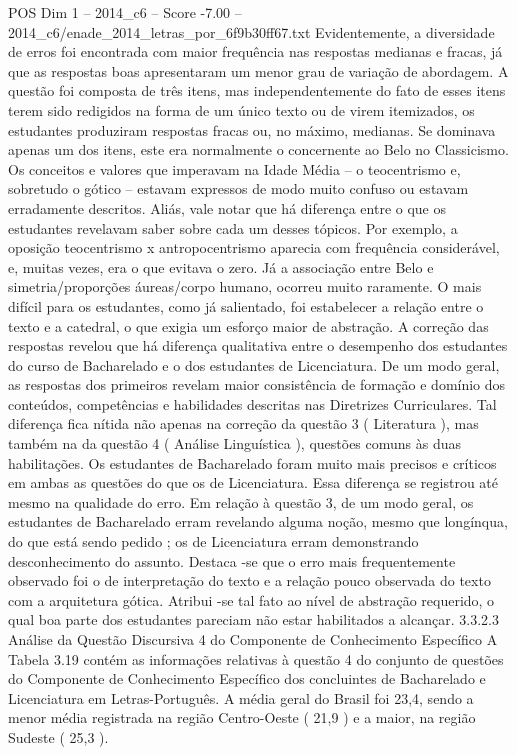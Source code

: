 \begin{textsample}{POS Dim 1 – 2014\_c6 – Score -7.00 – 2014\_c6/enade\_2014\_letras\_por\_6f9b30ff67.txt}
Evidentemente, a diversidade de erros foi encontrada com maior frequência nas respostas medianas e fracas, já que as respostas boas apresentaram um menor grau de variação de abordagem.
A questão foi composta de três itens, mas independentemente do fato de esses itens terem sido redigidos na forma de um único texto ou de virem itemizados, os estudantes produziram respostas fracas ou, no máximo, medianas.
Se dominava apenas um dos itens, este era normalmente o concernente ao Belo no Classicismo.
Os conceitos e valores que imperavam na Idade Média – o teocentrismo e, sobretudo o gótico – estavam expressos de modo muito confuso ou estavam erradamente descritos.
Aliás, vale notar que há diferença entre o que os estudantes revelavam saber sobre cada um desses tópicos.
Por exemplo, a oposição teocentrismo x antropocentrismo aparecia com frequência considerável, e, muitas vezes, era o que evitava o zero.
Já a associação entre Belo e simetria/proporções áureas/corpo humano, ocorreu muito raramente.
O mais difícil para os estudantes, como já salientado, foi estabelecer a relação entre o texto e a catedral, o que exigia um esforço maior de abstração.
A correção das respostas revelou que há diferença qualitativa entre o desempenho dos estudantes do curso de Bacharelado e o dos estudantes de Licenciatura.
De um modo geral, as respostas dos primeiros revelam maior consistência de formação e domínio dos conteúdos, competências e habilidades descritas nas Diretrizes Curriculares.
Tal diferença fica nítida não apenas na correção da questão 3 ( Literatura ), mas também na da questão 4 ( Análise Linguística ), questões comuns às duas habilitações.
Os estudantes de Bacharelado foram muito mais precisos e críticos em ambas as questões do que os de Licenciatura.
Essa diferença se registrou até mesmo na qualidade do erro.
Em relação à questão 3, de um modo geral, os estudantes de Bacharelado erram revelando alguma noção, mesmo que longínqua, do que está sendo pedido ; os de Licenciatura erram demonstrando desconhecimento do assunto.
Destaca -se que o erro mais frequentemente observado foi o de interpretação do texto e a relação pouco observada do texto com a arquitetura gótica.
Atribui -se tal fato ao nível de abstração requerido, o qual boa parte dos estudantes pareciam não estar habilitados a alcançar. 3.3.2.3 Análise da Questão Discursiva 4 do Componente de Conhecimento Específico A Tabela 3.19 contém as informações relativas à questão 4 do conjunto de questões do Componente de Conhecimento Específico dos concluintes de Bacharelado e Licenciatura em Letras-Português.
A média geral do Brasil foi 23,4, sendo a menor média registrada na região Centro-Oeste ( 21,9 ) e a maior, na região Sudeste ( 25,3 ).

\end{textsample}

